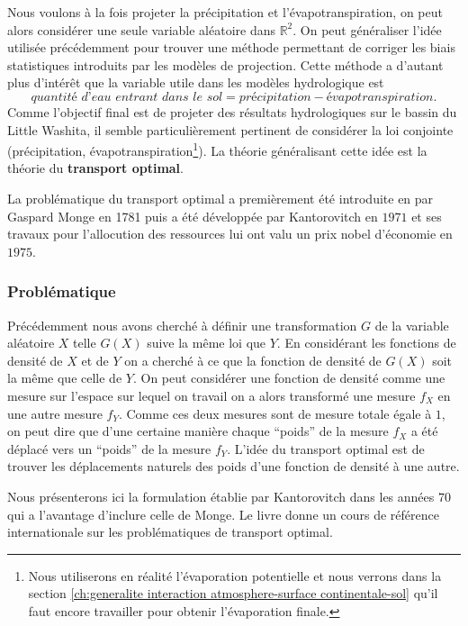 \documentclass[a4paper,11pt]{article}
\numberwithin{equation}{section}
\begin{document}
Nous voulons à la fois projeter la précipitation et l'évapotranspiration, on peut alors considérer une seule variable aléatoire dans $\mathbb{R}^2$. On peut généraliser l'idée utilisée précédemment pour trouver une méthode permettant de corriger les biais statistiques introduits par les modèles de projection. Cette méthode a d'autant plus d'intérêt que la variable utile dans les modèles hydrologique est 
\begin{equation}
	\label{eq:Qin-pr-etp}
	\textit{quantité d'eau entrant dans le sol}=\textit{précipitation}-\textit{évapotranspiration}.
\end{equation}
Comme l'objectif final est de projeter des résultats hydrologiques sur le bassin du Little Washita, il semble particulièrement pertinent de considérer la loi conjointe (précipitation, évapotranspiration\footnote{Nous utiliserons en réalité l'évaporation potentielle et nous verrons dans la section \ref{ch:generalite interaction atmosphere-surface continentale-sol} qu'il faut encore travailler pour obtenir l'évaporation finale.}). La théorie généralisant cette idée est la théorie du \textbf{transport optimal}.

La problématique du transport optimal a premièrement été introduite en par Gaspard Monge en 1781 puis a été développée par Kantorovitch en $1971$ et ses travaux pour l'allocution des ressources lui ont valu un prix nobel d'économie en $1975$.

\subsubsection{Problématique}
\label{ch:s-Problematique}

Précédemment nous avons cherché à définir une transformation $G$ de la variable aléatoire $X$ telle $G(X)$ suive la même loi que $Y$. En considérant les fonctions de densité de $X$ et de $Y$ on a cherché à ce que la fonction de densité de $G(X)$ soit la même que celle de $Y$. On peut considérer une fonction de densité comme une mesure sur l'espace sur lequel on travail on a alors transformé une mesure $f_X$ en une autre mesure $f_Y$. Comme ces deux mesures sont de mesure totale égale à $1$, on peut dire que d'une certaine manière chaque ``poids'' de la mesure $f_X$ a été déplacé vers un ``poids'' de la mesure $f_Y$. L'idée du transport optimal est de trouver les déplacements naturels des poids d'une fonction de densité à une autre.  

Nous présenterons ici la formulation établie par Kantorovitch dans les années $70$ qui a l'avantage d'inclure celle de Monge. Le livre \cite{villani2003topics} donne un cours de référence internationale sur les problématiques de transport optimal. 
\end{document}
